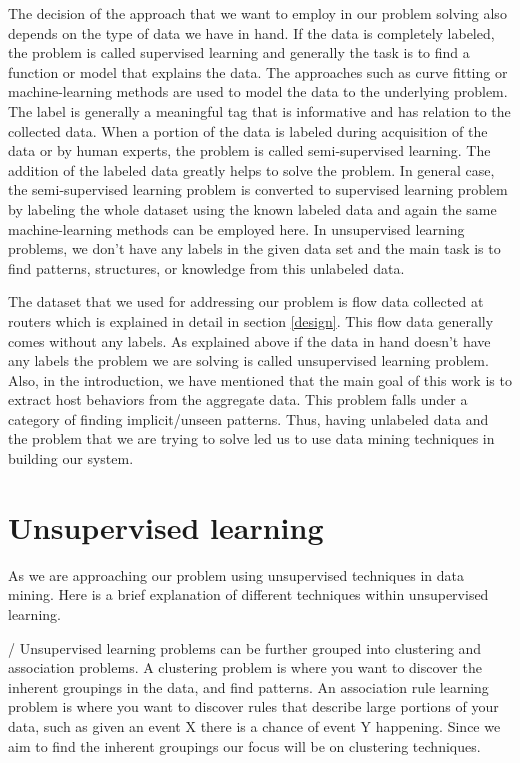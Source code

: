 The decision of the approach that we want to employ in our problem solving also depends on the type of data we have in hand. If the data is completely labeled, the problem is called supervised learning and generally the task is to find a function or model that explains the data. The approaches such as curve fitting or machine-learning methods are used to model the data to the underlying problem. The label is generally a meaningful tag that is informative and has relation to the collected data.  When a portion of the data is labeled during acquisition of the data or by human experts, the problem is called semi-supervised learning. The addition of the labeled data greatly helps to solve the problem. In general case, the semi-supervised learning problem is converted to supervised learning problem by labeling the whole dataset using the known labeled data and again the same machine-learning methods can be employed here. In unsupervised learning problems, we don't have any labels in the given data set and the main task is to find patterns, structures, or knowledge from this unlabeled data.   

The dataset that we used for addressing our problem is flow data collected at routers which is explained in detail in section \ref{design}. This flow data generally comes without any labels. As explained above if the data in hand doesn't have any labels the problem we are solving is called unsupervised learning problem. Also, in the introduction, we have mentioned that the main goal of this work is to extract host behaviors from the aggregate data. This problem falls under a category of finding implicit/unseen patterns. Thus, having unlabeled data and the problem that we are trying to solve led us to use data mining techniques in building our system.

\section{Unsupervised learning}  \label{unsupervised}
As we are approaching our problem using unsupervised techniques in data mining. Here is a brief explanation of different techniques within unsupervised learning.

/
Unsupervised learning problems can be further grouped into clustering and association problems. A clustering problem is where you want to discover the inherent groupings in the data, and find patterns. An association rule learning problem is where you want to discover rules that describe large portions of your data, such as given an event X there is a chance of event Y happening. Since we aim to find the inherent groupings our focus will be on clustering techniques.

